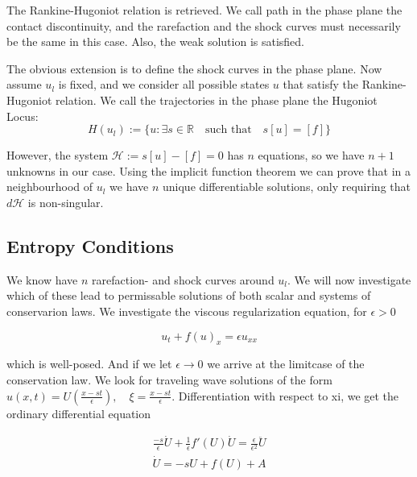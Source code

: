 \documentclass{article}
\numberwithin{equation}{section}
\begin{document}
The Rankine-Hugoniot relation is retrieved. We call path in the phase plane the contact discontinuity, and the rarefaction and the shock curves must necessarily be the same in this case. Also, the weak solution is satisfied. 

The obvious extension is to define the shock curves in the phase plane. Now assume $u_l$ is fixed, and we consider all possible states $u$ that satisfy the Rankine-Hugoniot relation. We call the trajectories in the phase plane the Hugoniot Locus:
\begin{equation}
    \label{Hugoniot_locus}
    H(u_l) := \{ u : \exists s\in \mathbb{R} \quad \text{such that} \quad s[u] = [f] \}
\end{equation}

However, the system $ \mathcal{H} := s[u] - [f] = 0 $ has $n$ equations, so we have $n+1$ unknowns in our case. Using the implicit function theorem we can prove that in a neighbourhood of $u_l$ we have $n$ unique differentiable solutions, only requiring that $d \mathcal{H}$ is non-singular. 
 


\subsection{Entropy Conditions}

We know have $n$ rarefaction- and shock curves around $u_l$. We will now investigate which of these lead to permissable solutions of both scalar and systems of conservarion laws. We investigate the viscous regularization equation, for $\epsilon > 0 $

\begin{equation}
    u_t + f(u)_x = \epsilon u_{xx}
    \label{Viscous_reg}
\end{equation}

which is well-posed. And if we let $\epsilon \to 0$ we arrive at the limitcase of the conservation law. We look for traveling wave solutions of the form $u(x,t) = U(\frac{x-st}{\epsilon}), \quad \xi = \frac{x-st}{\epsilon}$. Differentiation with respect to xi, we get the ordinary differential equation

\begin{equation*}
	    \begin{split}
	        \frac{-s}{\epsilon} \dot U + \frac{1}{\epsilon} f'(U) \dot U = \frac{\epsilon}{\epsilon^2} \ddot U \\
	        \dot U = -sU + f(U) + A \\
	    \end{split}
\end{equation*}
\end{document}
